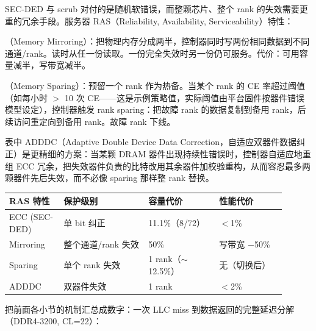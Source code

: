 

SEC-DED 与 scrub 对付的是随机软错误，而整颗芯片、整个 rank 的失效需要更重的冗余手段。服务器 RAS（Reliability, Availability, Serviceability）特性：

（Memory Mirroring）：把物理内存分成两半，控制器同时写两份相同数据到不同通道/rank。读时从任一份读取。一份完全失效时另一份仍可服务。代价：可用容量减半，写带宽减半。

（Memory Sparing）：预留一个 rank 作为热备。当某个 rank 的 CE 率超过阈值（如每小时 $>$ 10 次 CE——这是示例策略值，实际阈值由平台固件按器件错误模型设定），控制器触发 rank sparing：把故障 rank 的数据复制到备用 rank，后续访问重定向到备用 rank。故障 rank 下线。

表中 ADDDC（Adaptive Double Device Data Correction，自适应双器件数据纠正）是更精细的方案：当某颗 DRAM 器件出现持续性错误时，控制器自适应地重组 ECC 冗余，把失效器件负责的比特改用其余器件加校验重构，从而容忍最多两颗器件先后失效，而不必像 sparing 那样整 rank 替换。

\begin{longtable}{L{0.18\linewidth}L{0.28\linewidth}L{0.22\linewidth}L{0.22\linewidth}}
\toprule
RAS 特性 & 保护级别 & 容量代价 & 性能代价 \\
\midrule
ECC (SEC-DED) & 单 bit 纠正 & 11.1\%（8/72） & $<$1\% \\
Mirroring & 整个通道/rank 失效 & 50\% & 写带宽 $-$50\% \\
Sparing & 单个 rank 失效 & 1 rank（$\sim$12.5\%） & 无（切换后） \\
ADDDC & 双器件失效 & 1 rank & $<$2\% \\
\bottomrule
\end{longtable}


把前面各小节的机制汇总成数字：一次 LLC miss 到数据返回的完整延迟分解（DDR4-3200, CL=22）：

